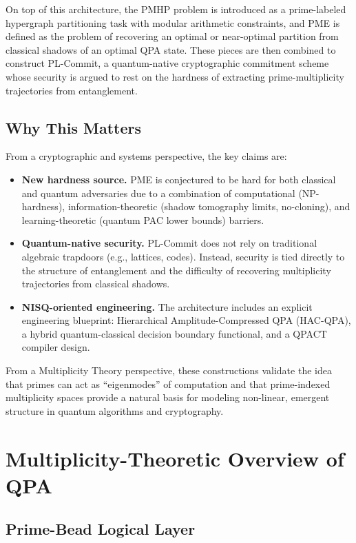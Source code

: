 \documentclass[11pt]{article}
\begin{document}
On top of this architecture, the PMHP problem is introduced as a prime-labeled hypergraph partitioning task with modular arithmetic constraints, and PME is defined as the problem of recovering an optimal or near-optimal partition from classical shadows of an optimal QPA state. These pieces are then combined to construct PL-Commit, a quantum-native cryptographic commitment scheme whose security is argued to rest on the hardness of extracting prime-multiplicity trajectories from entanglement.

\subsection{Why This Matters}

From a cryptographic and systems perspective, the key claims are:

\begin{itemize}
  \item \textbf{New hardness source.} PME is conjectured to be hard for both classical and quantum adversaries due to a combination of computational (NP-hardness), information-theoretic (shadow tomography limits, no-cloning), and learning-theoretic (quantum PAC lower bounds) barriers.
  \item \textbf{Quantum-native security.} PL-Commit does not rely on traditional algebraic trapdoors (e.g., lattices, codes). Instead, security is tied directly to the structure of entanglement and the difficulty of recovering multiplicity trajectories from classical shadows.
  \item \textbf{NISQ-oriented engineering.} The architecture includes an explicit engineering blueprint: Hierarchical Amplitude-Compressed QPA (HAC-QPA), a hybrid quantum-classical decision boundary functional, and a QPACT compiler design.
\end{itemize}

From a Multiplicity Theory perspective, these constructions validate the idea that primes can act as ``eigenmodes'' of computation and that prime-indexed multiplicity spaces provide a natural basis for modeling non-linear, emergent structure in quantum algorithms and cryptography.

\section{Multiplicity-Theoretic Overview of QPA}

\subsection{Prime-Bead Logical Layer}
\end{document}
